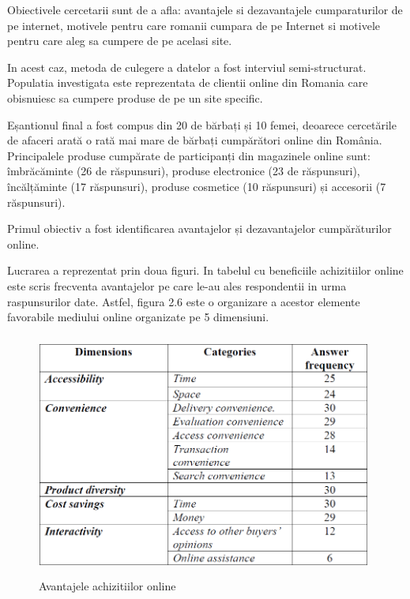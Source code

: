 \documentclass[a4paper, 12pt]{article}
\begin{document}
		\quad Obiectivele cercetarii sunt de a afla: avantajele si dezavantajele cumparaturilor de pe internet, motivele pentru care romanii cumpara de pe Internet si motivele pentru care aleg sa cumpere de pe acelasi site.
		
		\quad In acest caz, metoda de culegere a datelor a fost interviul semi-structurat. Populatia investigata este reprezentata de clientii online din Romania care obisnuiesc sa cumpere produse de pe un site specific. 
		
		\quad Eșantionul final a fost compus din 20 de bărbați și 10 femei, deoarece cercetările de afaceri arată o rată mai mare de bărbați cumpărători online din România. Principalele produse cumpărate de participanți din magazinele online sunt: îmbrăcăminte (26 de răspunsuri), produse electronice (23 de răspunsuri), încălțăminte (17 răspunsuri), produse cosmetice (10 răspunsuri) și accesorii (7 răspunsuri).
		
		\quad Primul obiectiv a fost identificarea avantajelor și dezavantajelor cumpărăturilor online. 
		 
		 \quad Lucrarea a reprezentat prin doua figuri. In tabelul cu beneficiile achizitiilor online este scris frecventa avantajelor pe care le-au ales respondentii in urma raspunsurilor date. Astfel, figura 2.6 este o organizare a acestor elemente favorabile mediului online organizate pe 5 dimensiuni.
		\begin{figure}[!htb]
			\centering
			\includegraphics[width=11cm, height=8cm]{"figures/zece.png"}
			\caption{Avantajele achizitiilor online}\label{fig:zece}
		\end{figure}
	
\end{document}
